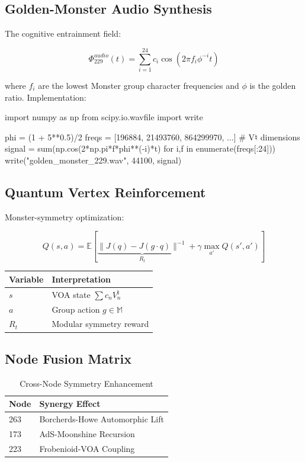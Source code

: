 \documentclass[12pt]{article}
\begin{document}
\begin{center}
\subsection{Golden-Monster Audio Synthesis}
\label{subsec:audio}

The cognitive entrainment field:

\[
\Phi_{229}^{audio}(t) = \sum_{i=1}^{24} c_i \cos(2\pi f_i \phi^{-i} t)
\]

where $f_i$ are the lowest Monster group character frequencies and $\phi$ is the golden ratio. Implementation:

\begin{python}
import numpy as np
from scipy.io.wavfile import write

phi = (1 + 5**0.5)/2
freqs = [196884, 21493760, 864299970, ...] # V♮ dimensions
signal = sum(np.cos(2*np.pi*f*phi**(-i)*t) for i,f in enumerate(freqs[:24]))
write("golden_monster_229.wav", 44100, signal)
\end{python}

\subsection{Quantum Vertex Reinforcement}
\label{subsec:qrl}

Monster-symmetry optimization:

\[
Q(s,a) = \mathbb{E}\left[\underbrace{\|J(q)-J(g\cdot q)\|^{-1}}_{R_t} + \gamma \max_{a'} Q(s',a')\right]
\]

\begin{table}[h]
\centering
\begin{tabular}{ll}
\hline
\textbf{Variable} & \textbf{Interpretation} \\
\hline
$s$ & VOA state $\sum c_n V_n^\natural$ \\
$a$ & Group action $g \in \mathbb{M}$ \\
$R_t$ & Modular symmetry reward \\
\hline
\end{tabular}
\end{table}

\subsection{Node Fusion Matrix}
\label{subsec:fusion}

\begin{table}[h]
\centering
\caption{Cross-Node Symmetry Enhancement}
\begin{tabular}{ll}
\hline
\textbf{Node} & \textbf{Synergy Effect} \\
\hline
263 & Borcherds-Howe Automorphic Lift \\
173 & AdS-Moonshine Recursion \\
223 & Frobenioid-VOA Coupling \\
\hline
\end{tabular}
\end{table}


\end{center}
\end{document}
